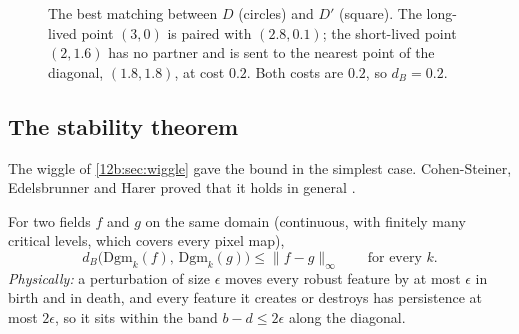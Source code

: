 \begin{figure}[htbp]
\centering
{}
\caption{The best matching between $D$ (circles) and $D'$ (square). The long-lived point $(3,0)$ is paired with
$(2.8,0.1)$; the short-lived point $(2,1.6)$ has no partner and is sent to the nearest point of the diagonal,
$(1.8,1.8)$, at cost $0.2$. Both costs are $0.2$, so $d_B=0.2$.}
\label{12b:fig:matching}
\end{figure}

\subsection{The stability theorem}
\label{12b:sec:theorem}

The wiggle of \cref{12b:sec:wiggle} gave the bound in the simplest case. Cohen-Steiner, Edelsbrunner and Harer
proved that it holds in general \cite{CohenSteiner2007}.

\begin{keyidea}
For two fields $f$ and $g$ on the same domain (continuous, with finitely many critical levels, which covers
every pixel map),
\begin{equation*}
  d_B\big(\mathrm{Dgm}_k(f),\,\mathrm{Dgm}_k(g)\big)\leq\|f-g\|_\infty\qquad\text{for every }k.
\end{equation*}
\emph{Physically:} a perturbation of size $\epsilon$ moves every robust feature by at most $\epsilon$ in birth and in
death, and every feature it creates or destroys has persistence at most $2\epsilon$, so it sits within the band
$b-d\leq2\epsilon$ along the diagonal.
\end{keyidea}

